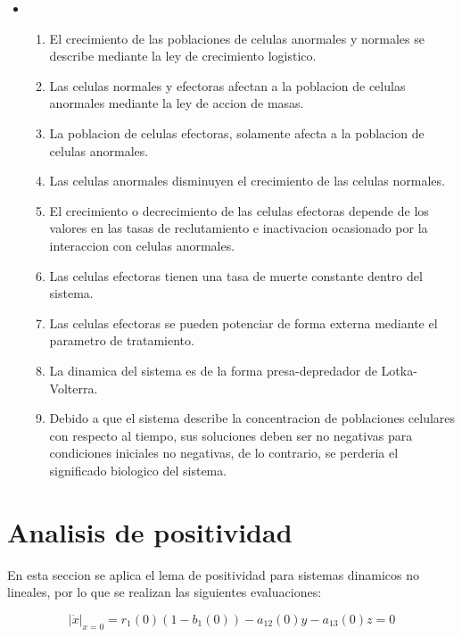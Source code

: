 \documentclass[letterpaper,11pt]{article}
\begin{document}
\begin{itemize}
\item 
\begin{enumerate}
\item El crecimiento de las poblaciones de celulas anormales y normales se
describe mediante la ley de crecimiento logistico.

\item Las celulas normales y efectoras afectan a la poblacion de celulas
anormales mediante la ley de accion de masas.

\item La poblacion de celulas efectoras, solamente afecta a la poblacion de
celulas anormales.

\item Las celulas anormales disminuyen el crecimiento de las celulas
normales.

\item El crecimiento o decrecimiento de las celulas efectoras depende de los
valores en las tasas de reclutamiento e inactivacion ocasionado por la
interaccion con celulas anormales.

\item Las celulas efectoras tienen una tasa de muerte constante dentro del
sistema.

\item Las celulas efectoras se pueden potenciar de forma externa mediante el
parametro de tratamiento.

\item La dinamica del sistema es de la forma presa-depredador de
Lotka-Volterra.

\item Debido a que el sistema describe la concentracion de poblaciones
celulares con respecto al tiempo, sus soluciones deben ser no negativas para
condiciones iniciales no negativas, de lo contrario, se perderia el
significado biologico del sistema.
\end{enumerate}
\end{itemize}

\section{Analisis de positividad}

En esta seccion se aplica el lema de positividad para sistemas dinamicos no
lineales, por lo que se realizan las siguientes evaluaciones:

\begin{equation*}
\left\vert \dot{x}\right\vert _{x=0}=r_{1}(0)(1-b_{1}\left( 0\right)
)-a_{12}\left( 0\right) y-a_{13}\left( 0\right) z=0
\end{equation*}
\end{document}
